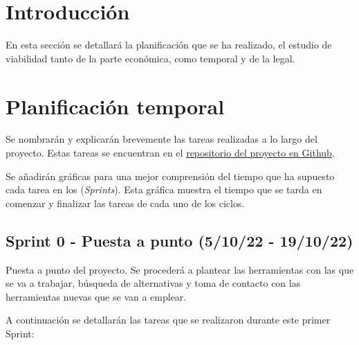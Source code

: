 
\section{Introducción}
En esta sección se detallará la planificación que se ha realizado, el estudio de viabilidad tanto de la parte económica, como temporal y de la legal. 
\section{Planificación temporal}
Se nombrarán y explicarán brevemente las tareas realizadas a lo largo del proyecto. Estas tareas se encuentran en el \href{https://github.com/drg1006/Gestor-TFG-2022}{repositorio del proyecto en Github}. 

Se añadirán gráficas para una mejor comprensión del tiempo que ha supuesto cada tarea en los (\emph{Sprints}). Esta gráfica muestra el tiempo que se tarda en comenzar y finalizar las tareas de cada uno de los ciclos.

\subsection{Sprint 0 - Puesta a punto (5/10/22 - 19/10/22)}
Puesta a punto del proyecto.
Se procederá a plantear las herramientas con las que se va a trabajar, búsqueda de alternativas y toma de contacto con las herramientas nuevas que se van a emplear.

A continuación se detallarán las tareas que se realizaron durante este primer Sprint:

